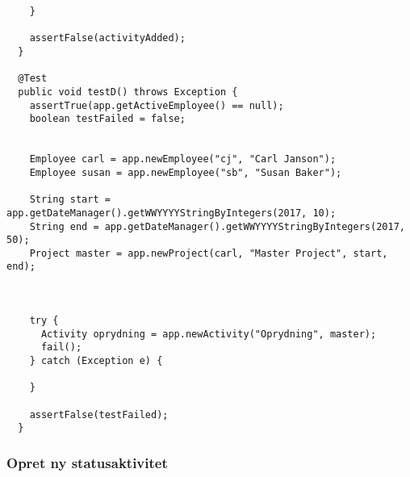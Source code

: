 \begin{lstlisting}
    }

    assertFalse(activityAdded); 
  }

  @Test
  public void testD() throws Exception {
    assertTrue(app.getActiveEmployee() == null); 
    boolean testFailed = false; 
    
    
    Employee carl = app.newEmployee("cj", "Carl Janson");
    Employee susan = app.newEmployee("sb", "Susan Baker");

    String start = app.getDateManager().getWWYYYYStringByIntegers(2017, 10);
    String end = app.getDateManager().getWWYYYYStringByIntegers(2017, 50);
    Project master = app.newProject(carl, "Master Project", start, end);
    
    

    try {
      Activity oprydning = app.newActivity("Oprydning", master);
      fail();
    } catch (Exception e) {

    }
    
    assertFalse(testFailed); 
  }
\end{lstlisting}

\subsubsection{Opret ny statusaktivitet}


